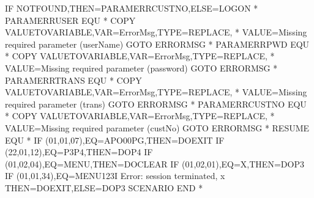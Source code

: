 \documentclass[letterpaper,10pt,english]{sphinxmanual}
\begin{document}
\begin{sphinxVerbatim}[commandchars=\\\{\}]
         IF\PYGZdl{}   NOT\PYGZhy{}FOUND,THEN=PARAM\PYGZus{}ERR\PYGZus{}CUSTNO,ELSE=LOGON
*
PARAM\PYGZus{}ERR\PYGZus{}USER EQU *
         COPY\PYGZdl{} VALUE\PYGZhy{}TO\PYGZhy{}VARIABLE,VAR=ErrorMsg,TYPE=REPLACE,            *
               VALUE=\PYGZsq{}Missing required parameter (userName)\PYGZsq{}
         GOTO\PYGZdl{} ERRORMSG
*
PARAM\PYGZus{}ERR\PYGZus{}PWD EQU   *
         COPY\PYGZdl{} VALUE\PYGZhy{}TO\PYGZhy{}VARIABLE,VAR=ErrorMsg,TYPE=REPLACE,            *
               VALUE=\PYGZsq{}Missing required parameter (password)\PYGZsq{}
         GOTO\PYGZdl{} ERRORMSG
*
PARAM\PYGZus{}ERR\PYGZus{}TRANS EQU   *
         COPY\PYGZdl{} VALUE\PYGZhy{}TO\PYGZhy{}VARIABLE,VAR=ErrorMsg,TYPE=REPLACE,            *
               VALUE=\PYGZsq{}Missing required parameter (trans)\PYGZsq{}
         GOTO\PYGZdl{} ERRORMSG
*
PARAM\PYGZus{}ERR\PYGZus{}CUSTNO EQU   *
         COPY\PYGZdl{} VALUE\PYGZhy{}TO\PYGZhy{}VARIABLE,VAR=ErrorMsg,TYPE=REPLACE,            *
               VALUE=\PYGZsq{}Missing required parameter (custNo)\PYGZsq{}
         GOTO\PYGZdl{} ERRORMSG
*\PYGZus{}\PYGZus{}\PYGZus{}\PYGZus{}\PYGZus{}\PYGZus{}\PYGZus{}\PYGZus{}\PYGZus{}\PYGZus{}\PYGZus{}\PYGZus{}\PYGZus{}\PYGZus{}\PYGZus{}\PYGZus{}\PYGZus{}\PYGZus{}\PYGZus{}\PYGZus{}\PYGZus{}\PYGZus{}\PYGZus{}\PYGZus{}\PYGZus{}\PYGZus{}\PYGZus{}\PYGZus{}\PYGZus{}\PYGZus{}\PYGZus{}\PYGZus{}\PYGZus{}\PYGZus{}\PYGZus{}\PYGZus{}\PYGZus{}\PYGZus{}\PYGZus{}\PYGZus{}\PYGZus{}\PYGZus{}\PYGZus{}\PYGZus{}\PYGZus{}\PYGZus{}\PYGZus{}\PYGZus{}\PYGZus{}\PYGZus{}\PYGZus{}\PYGZus{}\PYGZus{}\PYGZus{}\PYGZus{}\PYGZus{}\PYGZus{}\PYGZus{}\PYGZus{}\PYGZus{}\PYGZus{}\PYGZus{}\PYGZus{}\PYGZus{}\PYGZus{}\PYGZus{}\PYGZus{}\PYGZus{}\PYGZus{}\PYGZus{}
RESUME   EQU   *
         IF\PYGZdl{}   (01,01,07),EQ=\PYGZsq{}APO00PG\PYGZsq{},THEN=DOEXIT
         IF\PYGZdl{}   (22,01,12),EQ=\PYGZsq{}P3\PYGZhy{}\PYGZhy{}\PYGZhy{}\PYGZhy{}\PYGZhy{}\PYGZhy{}\PYGZhy{}\PYGZhy{}P4\PYGZsq{},THEN=DOP4
         IF\PYGZdl{}   (01,02,04),EQ=\PYGZsq{}MENU\PYGZsq{},THEN=DOCLEAR
         IF\PYGZdl{}   (01,02,01),EQ=\PYGZsq{}X\PYGZsq{},THEN=DOP3
         IF\PYGZdl{}   (01,01,34),EQ=\PYGZsq{}MENU123I Error: session terminated\PYGZsq{},     x
               THEN=DOEXIT,ELSE=DOP3
         SCENARIO END
*\PYGZus{}\PYGZus{}\PYGZus{}\PYGZus{}\PYGZus{}\PYGZus{}\PYGZus{}\PYGZus{}\PYGZus{}\PYGZus{}\PYGZus{}\PYGZus{}\PYGZus{}\PYGZus{}\PYGZus{}\PYGZus{}\PYGZus{}\PYGZus{}\PYGZus{}\PYGZus{}\PYGZus{}\PYGZus{}\PYGZus{}\PYGZus{}\PYGZus{}\PYGZus{}\PYGZus{}\PYGZus{}\PYGZus{}\PYGZus{}\PYGZus{}\PYGZus{}\PYGZus{}\PYGZus{}\PYGZus{}\PYGZus{}\PYGZus{}\PYGZus{}\PYGZus{}\PYGZus{}\PYGZus{}\PYGZus{}\PYGZus{}\PYGZus{}\PYGZus{}\PYGZus{}\PYGZus{}\PYGZus{}\PYGZus{}\PYGZus{}\PYGZus{}\PYGZus{}\PYGZus{}\PYGZus{}\PYGZus{}\PYGZus{}\PYGZus{}\PYGZus{}\PYGZus{}\PYGZus{}\PYGZus{}\PYGZus{}\PYGZus{}\PYGZus{}\PYGZus{}\PYGZus{}\PYGZus{}\PYGZus{}\PYGZus{}\PYGZus{}

\end{sphinxVerbatim}
\end{document}
